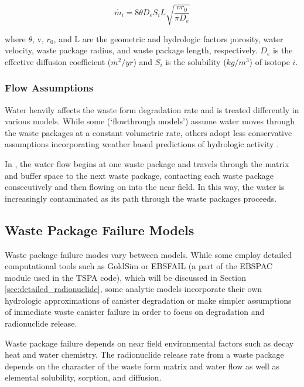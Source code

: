 \begin{equation}
 \dot{m_i}=8\theta D_eS_iL\sqrt{\frac{vr_0}{\pi D_e}}
\end{equation} 

where $\theta$, v, $r_0$, and L are the geometric and
hydrologic factors porosity, water velocity, waste package radius, and waste
package length, respectively. $D_e$ is the effective diffusion coefficient
($m^2/yr$)  and $S_i$ is the solubility ($kg/m^3$) of isotope $i$.

\subsubsection{Flow Assumptions}

Water heavily affects the waste 
form degradation rate and is treated differently in various models. While some 
(`flowthrough models') assume water moves through the waste packages at 
a constant volumetric rate, others adopt less conservative 
assumptions incorporating weather based predictions of hydrologic activity 
\cite{ahn_environmental_2007}.

In \cite{ahn_environmental_2007}, the water flow begins at 
one waste package and travels through the matrix and buffer space to the next 
waste package, contacting each waste package consecutively and then flowing on 
into the near field. In this way, the water is increasingly contaminated as its 
path through the waste packages proceeds.  



\subsection{Waste Package Failure Models}

Waste package failure modes vary between models. While some employ detailed 
computational tools such as GoldSim or EBSFAIL (a part of the EBSPAC module 
used in the \gls{TSPA} code), which will be discussed in Section 
\ref{sec:detailed_radionuclide}, some 
analytic models incorporate their own hydrologic approximations of
canister degradation or make simpler assumptions of immediate waste canister 
failure in order to focus on degradation and radionuclide release. 

Waste package failure depends on near field environmental factors such as decay 
heat and water chemistry.  
The radionuclide release rate from a waste 
package depends on the character of the waste form matrix and water flow as 
well as elemental solubility, sorption, and diffusion. 


